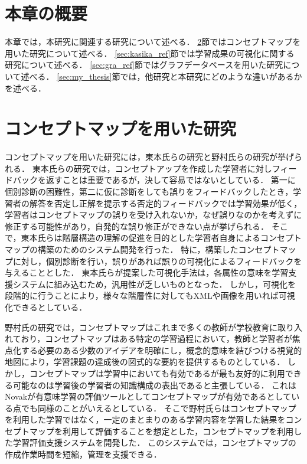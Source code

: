 \section{本章の概要}
本章では，本研究に関連する研究について述べる．
\ref{sec:concept_ref}節ではコンセプトマップを用いた研究について述べる．
\ref{sec:kasika_ref}節では学習成果の可視化に関する研究について述べる．
\ref{sec:gra_ref}節ではグラフデータベースを用いた研究について述べる．
\ref{sec:my_thesis}節では，他研究と本研究にどのような違いがあるかを述べる．

\section{コンセプトマップを用いた研究}\label{sec:concept_ref}
コンセプトマップを用いた研究には，東本氏らの研究\cite{toumoto}と野村氏らの研究\cite{nomura_manabu}が挙げられる．
東本氏らの研究では，コンセプトアップを作成した学習者に対しフィードバックを返すことは重要であるが，決して容易ではないとしている．
第一に個別診断の困難性，第二に仮に診断をしても誤りをフィードバックしたとき，学習者の解答を否定し正解を提示する否定的フィードバックでは学習効果が低く，学習者はコンセプトマップの誤りを受け入れないか，なぜ誤りなのかを考えずに修正する可能性があり，自発的な誤り修正ができない点が挙げられる．
そこで，東本氏らは階層構造の理解の促進を目的とした学習者自身によるコンセプトマップの構築のためのシステム開発を行った．
特に，構築したコンセプトマップに対し，個別診断を行い，誤りがあれば誤りの可視化によるフィードバックを与えることとした．
東本氏らが提案した可視化手法は，各属性の意味を学習支援システムに組み込むため，汎用性が乏しいものとなった．
しかし，可視化を段階的に行うことにより，様々な階層性に対してもXMLや画像を用いれば可視化できるとしている．

野村氏の研究では，コンセプトマップはこれまで多くの教師が学校教育に取り入れており，コンセプトマップはある特定の学習過程において，教師と学習者が焦点化する必要のある少数のアイデアを明確にし，概念的意味を結びつける視覚的地図により，学習課題の達成後の図式的な要約を提供するものとしている．
しかし，コンセプトマップは学習中においても有効であるが最も友好的に利用できる可能なのは学習後の学習者の知識構成の表出であると主張している．
これはNovak\cite{concept}\cite{novak}が有意味学習の評価ツールとしてコンセプトマップが有効であるとしている点でも同様のことがいえるとしている．
そこで野村氏らはコンセプトマップを利用した学習ではなく，一定のまとまりのある学習内容を学習した結果をコンセプトマップを利用して評価することを想定とした，コンセプトマップを利用した学習評価支援システムを開発した．
このシステムでは，コンセプトマップの作成作業時間を短縮，管理を支援できる．

